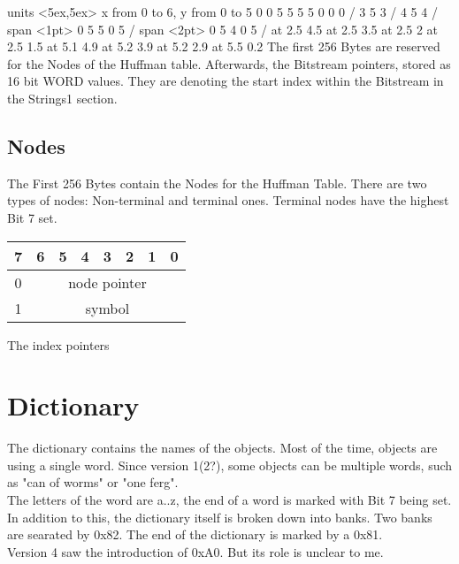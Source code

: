 \documentclass[11pt,twoside,openright]{report}
\begin{document}
\beginpicture
\setcoordinatesystem units <5ex,5ex>
\setplotarea x from 0 to 6, y from 0 to 5
 0 0 5 5 5 5 0 0 0 /
 3 5 3 /
 4 5 4 /
\setshadegrid span <1pt>
 0 5 5 0 5 /
\setshadegrid span <2pt>
 0 5 4 0 5 /
 at 2.5 4.5
 at 2.5 3.5
 at 2.5 2
 at 2.5 1.5
 at 5.1 4.9
 at 5.2 3.9
 at 5.2 2.9
 at 5.5 0.2
\endpicture
The first 256 Bytes are reserved for the Nodes of the Huffman table. Afterwards, the Bitstream pointers, stored as 16 bit WORD values. They are denoting the start index within the Bitstream in the Strings1 section.
\section{Nodes}
The First 256 Bytes contain the Nodes for the Huffman Table. There are two types of nodes: Non-terminal and terminal ones. Terminal nodes have the highest Bit 7 set.

\begin{tabular}{|c|c|c|c|c|c|c|c|}
\tiny 7&\tiny 6&\tiny 5&\tiny 4&\tiny 3&\tiny 2&\tiny 1&\tiny 0\\\hline
0&\multicolumn{7}{c|}{node pointer}\\\hline
1&\multicolumn{7}{c|}{symbol}\\\hline
\end{tabular}
The index pointers

\chapter{Dictionary}
The dictionary contains the names of the objects. Most of the time, objects are using a single word. Since version 1(2?), some objects can be multiple words, such as "can of worms" or "one ferg".\\
The letters of the word are a..z, the end of a word is marked with Bit 7 being set.\\
In addition to this, the dictionary itself is broken down into banks. Two banks are searated by 0x82. The end of the dictionary is marked by a 0x81.\\
Version 4 saw the introduction of 0xA0. But its role is unclear to me.\\
\end{document}
